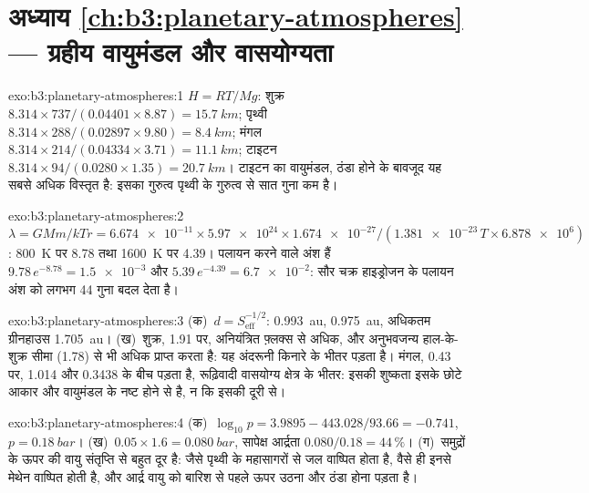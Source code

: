 \section*{अध्याय \ref{ch:b3:planetary-atmospheres} --- ग्रहीय वायुमंडल और वासयोग्यता}

\begin{solution}{exo:b3:planetary-atmospheres:1}
$H = RT/Mg$: शुक्र $8.314\times737/(0.04401\times8.87) = \qty{15.7}{km}$;
पृथ्वी $8.314\times288/(0.02897\times9.80) = \qty{8.4}{km}$; मंगल
$8.314\times214/(0.04334\times3.71) = \qty{11.1}{km}$; टाइटन
$8.314\times94/(0.0280\times1.35) = \qty{20.7}{km}$। टाइटन का वायुमंडल,
ठंडा होने के बावजूद यह सबसे अधिक विस्तृत है: इसका गुरुत्व
पृथ्वी के गुरुत्व से सात गुना कम है।
\end{solution}

\begin{solution}{exo:b3:planetary-atmospheres:2}
$\lambda = GMm/kTr = \num{6.674e-11}\times\num{5.97e24}\times\num{1.674e-27}
/(\num{1.381e-23}\,T\times\num{6.878e6})$: \qty{800}{K} पर 8.78 तथा
\qty{1600}{K} पर 4.39। पलायन करने वाले अंश हैं $9.78\,e^{-8.78} =
\num{1.5e-3}$ और $5.39\,e^{-4.39} = \num{6.7e-2}$: सौर चक्र
हाइड्रोजन के पलायन अंश को लगभग 44 गुना बदल देता है।
\end{solution}

\begin{solution}{exo:b3:planetary-atmospheres:3}
(क)~$d = S_\mathrm{eff}^{-1/2}$:  \qty{0.993}{au},  \qty{0.975}{au}, अधिकतम ग्रीनहाउस \qty{1.705}{au}। (ख)~शुक्र, 1.91 पर,
अनियंत्रित फ़्लक्स से अधिक, और अनुभवजन्य हाल-के-शुक्र सीमा (1.78) से भी
अधिक प्राप्त करता है: यह अंदरूनी किनारे के भीतर पड़ता है। मंगल, 0.43 पर,
1.014 और 0.3438 के बीच पड़ता है, रूढ़िवादी वासयोग्य क्षेत्र के भीतर:
इसकी शुष्कता इसके छोटे आकार और वायुमंडल के नष्ट होने से है,
न कि इसकी दूरी से।
\end{solution}

\begin{solution}{exo:b3:planetary-atmospheres:4}
(क)~$\log_{10}p = 3.9895 - 443.028/93.66 = -0.741$, $p =
\qty{0.18}{bar}$। (ख)~$0.05\times1.6 = \qty{0.080}{bar}$, सापेक्ष
आर्द्रता $0.080/0.18 = 44\,\%$। (ग)~समुद्रों के ऊपर की वायु
संतृप्ति से बहुत दूर है: जैसे पृथ्वी के महासागरों से जल वाष्पित होता है, वैसे ही इनसे मेथेन वाष्पित होती है,
और आर्द्र वायु को बारिश से पहले ऊपर उठना और ठंडा होना पड़ता है।
\end{solution}

